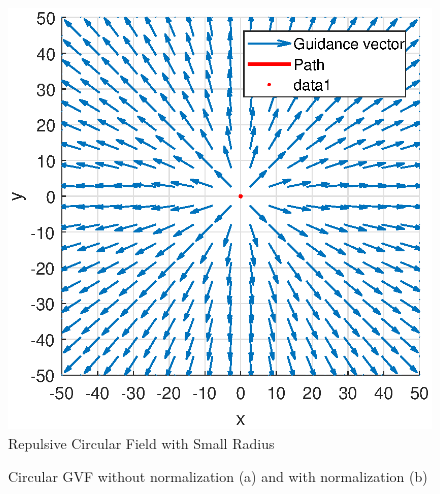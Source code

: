 \documentclass[numbered,pdftex]{ohio-etd}
\begin{document}
\begin{figure}[H]
	\centering
	\includegraphics[width=0.7\linewidth]{Figures/methods/normalizedRepulsive}
	\caption{Repulsive Circular Field with Small Radius}
	\label{fig:normalizedrepulsive}
\end{figure}

\begin{figure}[H]
	\begin{subfigmatrix}{2}%
		\centering	
		\hspace*{0mm}
	\end{subfigmatrix}
	\caption{Circular GVF without normalization (a) and with normalization (b)}
	\label{fig:gvfCircCirculation}
\end{figure}
\end{document}
